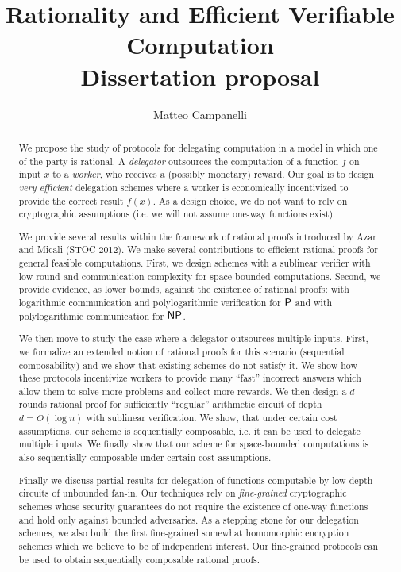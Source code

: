 \documentclass[nobib]{tufte-handout}
\title[Rationality and \\ Efficient Verifiable Computation]{Rationality and Efficient Verifiable Computation\\ \noindent \small{Dissertation proposal}}
\author{Matteo Campanelli}
\date{}
\begin{document}
\maketitle

  
  \begin{abstract}
  	\noindent
  	We propose the study of protocols for delegating computation in a model in which one of the party is rational.
  	A \textit{delegator} outsources the computation of a function $f$ on input $x$ to a \textit{worker}, who
  	receives a (possibly monetary) reward. Our goal is to design \textit{very efficient} delegation schemes 
  	where a worker is economically incentivized to provide the correct result
  	$f(x)$. As a design choice, we do not want to rely on cryptographic assumptions
  	(i.e. we will not assume one-way functions exist).
  	
  	We provide several results within the framework of rational proofs introduced by Azar and Micali (STOC 2012).
  	We make several contributions to efficient rational proofs for general feasible computations.
  	First, we design schemes with a sublinear verifier with low round and communication complexity for
  	space-bounded computations.
  	Second, we provide evidence, as lower bounds, against the existence of rational proofs:
  	with logarithmic communication and polylogarithmic verification for $\P$ and 
  	with polylogarithmic communication for $\NP$.
  	
  	We then move to study the case where a delegator outsources multiple inputs.
  	First, we formalize an extended notion of rational proofs for this scenario (sequential composability) and we
  	show that existing schemes do not satisfy it. We show how these protocols incentivize workers
  	to provide many ``fast'' incorrect answers which allow them to solve more problems and collect more rewards.
  	We then design a $d$-rounds rational proof for sufficiently ``regular'' arithmetic circuit of depth $d = O(\log{n})$
  	with sublinear verification. We show, that under certain cost assumptions, our scheme is sequentially composable,
  	i.e. it can be used to delegate multiple inputs. We finally show that our scheme for space-bounded computations is also 
  	sequentially composable under certain cost assumptions.
  	
  	
	Finally we discuss partial results for delegation of functions computable by low-depth circuits of unbounded fan-in.
	Our techniques rely on \textit{fine-grained} cryptographic schemes whose security guarantees do not require the existence of one-way functions
	and hold only against bounded adversaries. As a stepping stone for our delegation schemes, we also build 
	the first fine-grained somewhat homomorphic encryption schemes which we believe to be of independent interest.
	Our fine-grained protocols can be used to obtain sequentially composable rational proofs.
  \end{abstract}
  
\end{document}
